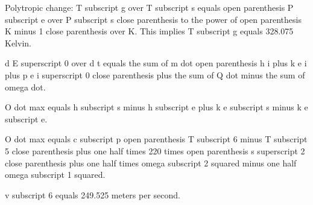 Polytropic change:
T subscript g over T subscript s equals open parenthesis P subscript e over P subscript s close parenthesis to the power of open parenthesis K minus 1 close parenthesis over K. This implies T subscript g equals 328.075 Kelvin.

d E superscript 0 over d t equals the sum of m dot open parenthesis h i plus k e i plus p e i superscript 0 close parenthesis plus the sum of Q dot minus the sum of omega dot. 

O dot max equals h subscript s minus h subscript e plus k e subscript s minus k e subscript e.

O dot max equals c subscript p open parenthesis T subscript 6 minus T subscript 5 close parenthesis plus one half times 220 times open parenthesis s superscript 2 close parenthesis plus one half times omega subscript 2 squared minus one half omega subscript 1 squared.

v subscript 6 equals 249.525 meters per second.